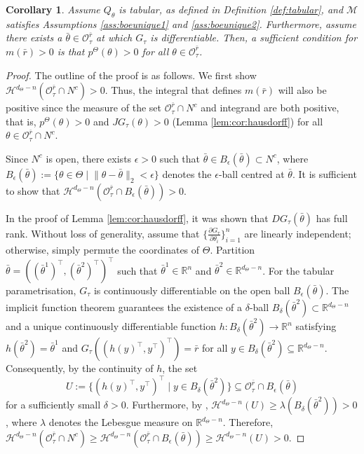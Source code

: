 \documentclass{amsart}
\newtheorem{corollary}{Corollary}
\begin{document}
\begin{corollary}\label{cor:tabularhausdorff_m}
Assume $Q_\theta$ is tabular, as defined in Definition \ref{def:tabular},  and $\mathcal{M}$  satisfies Assumptions \ref{ass:boeunique1} and \ref{ass:boeunique2}. Furthermore, assume there exists a $\bar{\theta} \in \mathcal{O}_\tau^{\bar{r}}$ at which $G_\tau$ is differentiable. Then, a sufficient condition for $m(\bar{r}) > 0$ is that $p^\Theta(\theta)>0$ for all $\theta \in \mathcal{O}_\tau^{\bar{r}}$.
\end{corollary}



\begin{proof}The outline of the proof is as follows. We first show $\mathcal{H}^{d_\Theta-n}(\mathcal{O}_\tau^{\bar{r}} \cap N^c) >0$. Thus, the integral that defines $m(\bar{r})$ will also be positive since the measure of the set $\mathcal{O}_\tau^{\bar{r}} \cap N^c$ and integrand are both positive, that is, $p^\Theta(\theta)>0$ and $JG_\tau(\theta) > 0$ (Lemma \ref{lem:cor:hausdorff}) for all $\theta \in \mathcal{O}_\tau^{\bar{r}} \cap N^c$. 

     Since $N^c$ is open, there exists $\epsilon > 0$ such that $\bar{\theta} \in B_\epsilon(\bar{\theta}) \subset N^c$, where $B_\epsilon(\bar{\theta}):= \{\theta \in \Theta \mid \lVert \theta-\bar{\theta}\rVert_2 < \epsilon\}$ denotes the $\epsilon$-ball centred at $\bar{\theta}$.
     It is sufficient to show that $\mathcal{H}^{d_\Theta-n}(\mathcal{O}_\tau^{\bar{r}} \cap B_\epsilon(\bar{\theta})) > 0$. 
     
    In the proof of Lemma \ref{lem:cor:hausdorff}, it was shown that $DG_\tau(\bar{\theta})$ has full rank. Without loss of generality, assume that $\{\frac{\partial G_\tau}{\partial \theta_i}\}_{i=1}^n$ are linearly independent; otherwise, simply permute the coordinates of $\Theta$. Partition $\bar{\theta}=((\bar{\theta}^1)^\top,(\bar{\theta}^2)^\top)^\top$ such that $\bar{\theta}^1 \in \mathbb{R}^n$ and $\bar{\theta}^2 \in \mathbb{R}^{d_\Theta-n}$. For the tabular parametrisation, $G_\tau$ is continuously differentiable on the open ball $B_\epsilon(\bar{\theta})$. The implicit function theorem \citep{analysis_reference_rudin} guarantees the existence of a $\delta$-ball $B_\delta(\bar{\theta}^2) \subset \mathbb{R}^{d_\Theta-n}$ and a unique continuously differentiable function $h:B_\delta(\bar{\theta}^2) \rightarrow \mathbb{R}^n$ satisfying $h(\bar{\theta}^2)=\bar{\theta}^1$ and $G_\tau((h(y)^\top,y^\top)^\top)=\bar{r}$ for all $y \in B_\delta(\bar{\theta}^2)  \subseteq \mathbb{R}^{d_\Theta-n}$. Consequently, by the continuity of $h$, the set
     $$U:= \{ (h(y)^\top,y^\top)^\top \mid y \in B_\delta(\bar{\theta}^2)\} \subseteq \mathcal{O}_\tau^{\bar{r}} \cap B_\epsilon(\bar{\theta})$$ 
     for a sufficiently small $\delta > 0$. 
     Furthermore, by \citet[Theorem 2.8 (ii)]{hausdorff_evans_2015}, 
     $\mathcal{H}^{d_\Theta-n}(U)\geq \lambda(B_\delta(\bar{\theta}^2)) > 0$, where $\lambda$ denotes the Lebesgue measure on $\mathbb{R}^{d_\Theta-n}$. Therefore, $\mathcal{H}^{d_\Theta-n}(\mathcal{O}_\tau^{\bar{r}} \cap N^c) \geq \mathcal{H}^{d_\Theta-n}(\mathcal{O}_\tau^{\bar{r}} \cap B_\epsilon(\bar{\theta})) \geq \mathcal{H}^{d_\Theta-n}(U) > 0$.
\end{proof}
\end{document}
